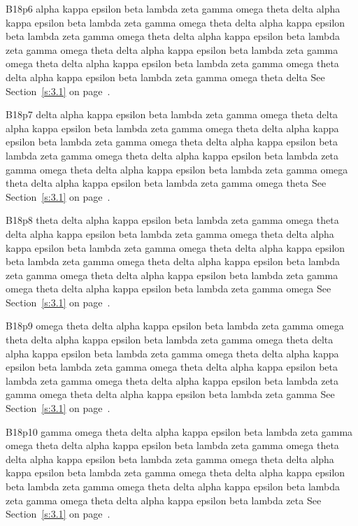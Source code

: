 B18p6 alpha kappa epsilon beta lambda zeta gamma omega theta delta alpha kappa epsilon beta lambda zeta gamma omega theta delta alpha kappa epsilon beta lambda zeta gamma omega theta delta alpha kappa epsilon beta lambda zeta gamma omega theta delta alpha kappa epsilon beta lambda zeta gamma omega theta delta alpha kappa epsilon beta lambda zeta gamma omega theta delta alpha kappa epsilon beta lambda zeta gamma omega theta delta See Section~\ref{s:3.1} on page~\pageref{s:3.1}.

B18p7 delta alpha kappa epsilon beta lambda zeta gamma omega theta delta alpha kappa epsilon beta lambda zeta gamma omega theta delta alpha kappa epsilon beta lambda zeta gamma omega theta delta alpha kappa epsilon beta lambda zeta gamma omega theta delta alpha kappa epsilon beta lambda zeta gamma omega theta delta alpha kappa epsilon beta lambda zeta gamma omega theta delta alpha kappa epsilon beta lambda zeta gamma omega theta See Section~\ref{s:3.1} on page~\pageref{s:3.1}.

B18p8 theta delta alpha kappa epsilon beta lambda zeta gamma omega theta delta alpha kappa epsilon beta lambda zeta gamma omega theta delta alpha kappa epsilon beta lambda zeta gamma omega theta delta alpha kappa epsilon beta lambda zeta gamma omega theta delta alpha kappa epsilon beta lambda zeta gamma omega theta delta alpha kappa epsilon beta lambda zeta gamma omega theta delta alpha kappa epsilon beta lambda zeta gamma omega See Section~\ref{s:3.1} on page~\pageref{s:3.1}.

B18p9 omega theta delta alpha kappa epsilon beta lambda zeta gamma omega theta delta alpha kappa epsilon beta lambda zeta gamma omega theta delta alpha kappa epsilon beta lambda zeta gamma omega theta delta alpha kappa epsilon beta lambda zeta gamma omega theta delta alpha kappa epsilon beta lambda zeta gamma omega theta delta alpha kappa epsilon beta lambda zeta gamma omega theta delta alpha kappa epsilon beta lambda zeta gamma See Section~\ref{s:3.1} on page~\pageref{s:3.1}.

B18p10 gamma omega theta delta alpha kappa epsilon beta lambda zeta gamma omega theta delta alpha kappa epsilon beta lambda zeta gamma omega theta delta alpha kappa epsilon beta lambda zeta gamma omega theta delta alpha kappa epsilon beta lambda zeta gamma omega theta delta alpha kappa epsilon beta lambda zeta gamma omega theta delta alpha kappa epsilon beta lambda zeta gamma omega theta delta alpha kappa epsilon beta lambda zeta See Section~\ref{s:3.1} on page~\pageref{s:3.1}.

